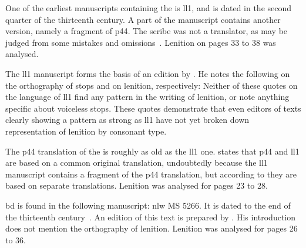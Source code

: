 One of the earliest manuscripts containing the  is \gls{ll1}, and
is dated in the second quarter of the thirteenth century.  A part of
the manuscript contains another version, namely a fragment
of \gls{p44}. The scribe was not a translator, as may be judged from
some mistakes and omissions~\autocite[xxxvii]{roberts_brut_1971}.
Lenition on pages 33 to 38 was analysed.

The \gls{ll1} manuscript forms the basis of an edition
by \textcite{roberts_brut_1971}.  He notes the following on the
orthography of stops and on lenition, respectively:
Neither of these quotes on the language of \gls{ll1} find any pattern in the writing of lenition, or note anything specific about voiceless stops.
These quotes demonstrate that even editors of texts clearly showing a pattern as strong as \gls{ll1} have not yet broken down representation of lenition by consonant type.

The \gls{p44} translation of the  is roughly as old as the \gls{ll1} one.
\Textcite{lewis_brut_1942}  states that \gls{p44} and \gls{ll1} are based on a common original translation, undoubtedly because the \gls{ll1} manuscript contains a fragment of the \gls{p44} translation, but according to \textcite[xliii--xliv]{roberts_astudiaeth_1969}  they are based on separate translations.
Lenition was analysed for pages 23 to 28.

\Gls{bd} is found in the following manuscript: \gls{nlw} MS 5266.
It is dated to the end of the thirteenth century~\autocite[xliii]{roberts_astudiaeth_1969}.
An edition of this text is prepared by \textcite{lewis_brut_1942}.
His introduction does not mention the orthography of lenition.
Lenition was analysed for pages 26 to 36.




